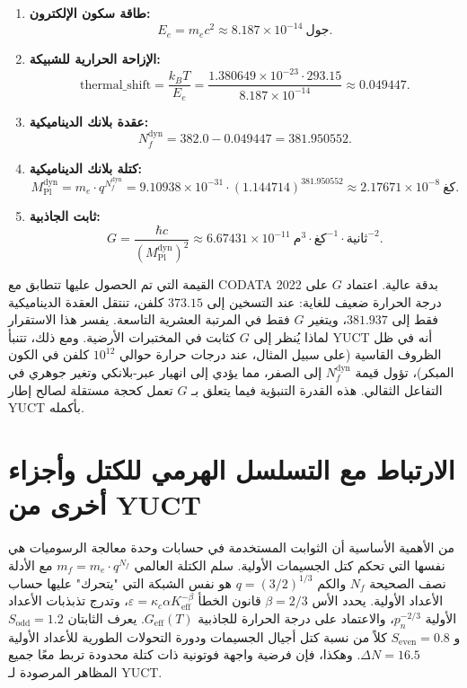 \documentclass[11pt,a4paper]{article}
\begin{document}
	\begin{enumerate}
		\item \textbf{طاقة سكون الإلكترون:}
		\begin{equation}
			E_e = m_e c^2 \approx 8.187 \times 10^{-14}~\text{جول}.
		\end{equation}
		\item \textbf{الإزاحة الحرارية للشبيكة:}
		\begin{equation}
			\text{thermal\_shift} = \frac{k_B T}{E_e} = \frac{1.380649 \times 10^{-23} \cdot 293.15}{8.187 \times 10^{-14}} \approx 0.049447.
		\end{equation}
		\item \textbf{عقدة بلانك الديناميكية:}
		\begin{equation}
			N_f^{\text{dyn}} = 382.0 - 0.049447 = 381.950552.
		\end{equation}
		\item \textbf{كتلة بلانك الديناميكية:}
		\begin{equation}
			M_{\text{Pl}}^{\text{dyn}} = m_e \cdot q^{N_f^{\text{dyn}}} = 9.10938 \times 10^{-31} \cdot (1.144714)^{381.950552} \approx 2.17671 \times 10^{-8}~\text{كغ}.
		\end{equation}
		\item \textbf{ثابت الجاذبية:}
		\begin{equation}
			G = \frac{\hbar c}{(M_{\text{Pl}}^{\text{dyn}})^2} \approx 6.67431 \times 10^{-11}~\text{م}^3\!\cdot\!\text{كغ}^{-1}\!\cdot\!\text{ثانية}^{-2}.
		\end{equation}
	\end{enumerate}
	
	القيمة التي تم الحصول عليها تتطابق مع CODATA 2022 بدقة عالية. اعتماد $G$ على درجة الحرارة ضعيف للغاية: عند التسخين إلى $373.15$ كلفن، تنتقل العقدة الديناميكية فقط إلى $381.937$، ويتغير $G$ فقط في المرتبة العشرية التاسعة. يفسر هذا الاستقرار لماذا يُنظر إلى $G$ كثابت في المختبرات الأرضية. ومع ذلك، تتنبأ YUCT أنه في ظل الظروف القاسية (على سبيل المثال، عند درجات حرارة حوالي $10^{12}$ كلفن في الكون المبكر)، تؤول قيمة $N_f^{\text{dyn}}$ إلى الصفر، مما يؤدي إلى انهيار عبر-بلانكي وتغير جوهري في التفاعل الثقالي. هذه القدرة التنبؤية فيما يتعلق بـ $G$ تعمل كحجة مستقلة لصالح إطار YUCT بأكمله.
	
	\section{الارتباط مع التسلسل الهرمي للكتل وأجزاء أخرى من YUCT}
	من الأهمية الأساسية أن الثوابت المستخدمة في حسابات وحدة معالجة الرسوميات هي نفسها التي تحكم كتل الجسيمات الأولية. سلم الكتلة العالمي $m_f = m_e \cdot q^{N_f}$ مع الأدلة نصف الصحيحة $N_f$ والكم $q = (3/2)^{1/3}$ هو نفس الشبكة التي "يتحرك" عليها حساب الأعداد الأولية. يحدد الأس $\beta = 2/3$ قانون الخطأ $\varepsilon = \kappa_c \alpha K_{\mathrm{eff}}^{-\beta}$، وتدرج تذبذبات الأعداد الأولية $p_n^{-2/3}$، والاعتماد على درجة الحرارة للجاذبية $G_{\mathrm{eff}}(T)$. يعرف الثابتان $S_{\mathrm{odd}} = 1.2$ و $S_{\mathrm{even}} = 0.8$ كلاً من نسبة كتل أجيال الجسيمات ودورة التحولات الطورية للأعداد الأولية $\Delta N = 16.5$. وهكذا، فإن فرضية واجهة فوتونية ذات كتلة محدودة تربط معًا جميع المظاهر المرصودة لـ YUCT.
	
\end{document}

